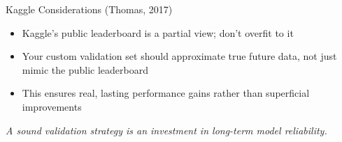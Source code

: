 \documentclass[aspectratio=169]{beamer}
\begin{document}

\begin{frame}{Kaggle Considerations (Thomas, 2017)}
\begin{itemize}
\item Kaggle’s public leaderboard is a partial view; don’t overfit to it
\item Your custom validation set should approximate true future data, not just mimic the public leaderboard
\item This ensures real, lasting performance gains rather than superficial improvements
\end{itemize}

\emph{A sound validation strategy is an investment in long-term model reliability.}
\end{frame}

%
\end{document}
